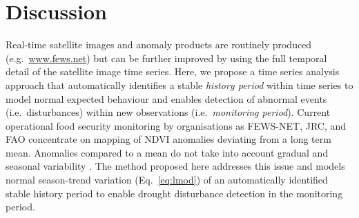 \documentclass[authoryear,preprint,review,10pt]{elsarticle}
\begin{document}
\section{Discussion} \label{sec:Disc}

Real-time satellite images and anomaly products are routinely produced (e.g.\ \url{www.fews.net}) but can be further improved by using the full temporal detail of the satellite image time series. Here, we propose a time series analysis approach that automatically identifies a stable \emph{history period} within time series to model normal expected behaviour and enables detection of abnormal events (i.e.\ disturbances) within new observations (i.e.\ \emph{monitoring period}). Current operational food security monitoring by organisations as FEWS-NET, JRC, and FAO concentrate on mapping of NDVI anomalies deviating from a long term mean. Anomalies compared to a mean do not take into account gradual and seasonal variability \citep{Vrieling:2011da}. The method proposed here addresses this issue and models normal season-trend variation (Eq.~\ref{eq:lmod}) of an automatically identified stable history period to enable drought disturbance detection in the monitoring period.
\end{document}
